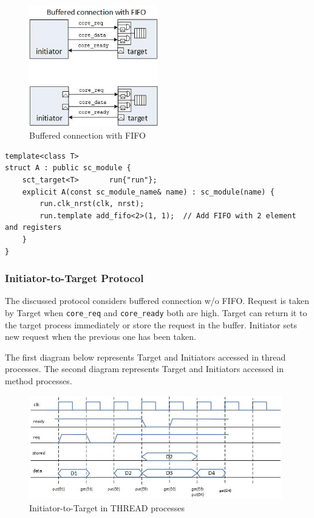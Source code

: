 \begin{figure}[!htb]
\centering
\includegraphics[width=0.5\textwidth]{pics/ss_buff_fifo_conn.jpg}
\caption{Buffered connection with FIFO}
\label{fig:ss_usage}
\end{figure}

\begin{lstlisting}[style=mycpp]
template<class T>
struct A : public sc_module {
    sct_target<T>       run{"run"}; 
    explicit A(const sc_module_name& name) : sc_module(name) {
        run.clk_nrst(clk, nrst);
        run.template add_fifo<2>(1, 1);  // Add FIFO with 2 element and registers 
    }
}
\end{lstlisting}

\subsubsection{Initiator-to-Target Protocol}

The discussed protocol considers buffered connection w/o FIFO. Request is taken by Target when {\tt core\_req} and {\tt core\_ready} both are high. Target can return it to the target process immediately or store the request in the buffer. Initiator sets new request when the previous one has been taken.

The first diagram below represents Target and Initiators accessed in thread processes. The second diagram represents Target and Initiators accessed in method processes.

\begin{figure}[!htb]
\centering
\includegraphics[width=0.98\textwidth]{pics/ss_prot_tt.jpg}
\caption{Initiator-to-Target in THREAD processes}
\label{fig:ss_usage}
\end{figure}

